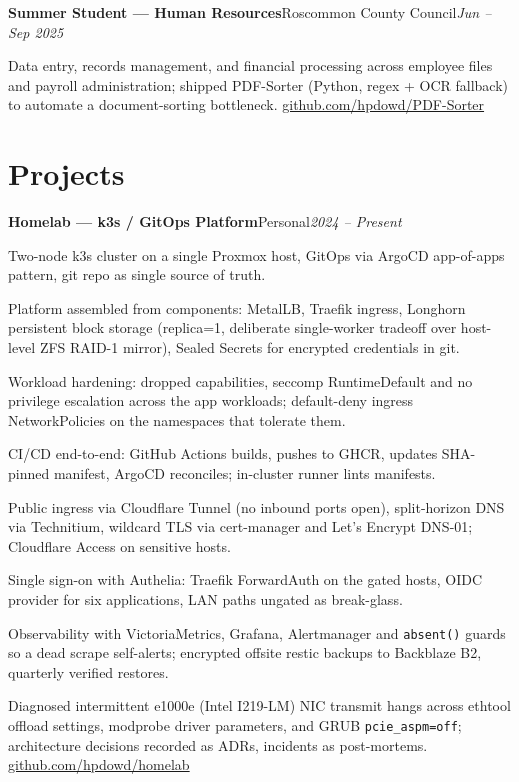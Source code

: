 \documentclass[a4paper,10pt]{article}
\newcommand{\cventry}[3]{\vspace{3pt}\noindent\textbf{#1}\enspace\textperiodcentered\enspace #2\hfill{\small\textit{\color{datesgrey}#3}}\par\vspace{1pt}}
\begin{document}
\cventry{Summer Student --- Human Resources}{Roscommon County Council}{Jun -- Sep 2025}
\begin{cvitems}
  \item Data entry, records management, and financial processing across employee files and payroll administration; shipped PDF-Sorter (Python, regex + OCR fallback) to automate a document-sorting bottleneck. \href{https://github.com/hpdowd/PDF-Sorter}{github.com/hpdowd/PDF-Sorter}
\end{cvitems}

\section{Projects}
\cventry{Homelab --- k3s / GitOps Platform}{Personal}{2024 -- Present}
\begin{cvitems}
  \item Two-node k3s cluster on a single Proxmox host, GitOps via ArgoCD app-of-apps pattern, git repo as single source of truth.
  \item Platform assembled from components: MetalLB, Traefik ingress, Longhorn persistent block storage (replica=1, deliberate single-worker tradeoff over host-level ZFS RAID-1 mirror), Sealed Secrets for encrypted credentials in git.
  \item Workload hardening: dropped capabilities, seccomp RuntimeDefault and no privilege escalation across the app workloads; default-deny ingress NetworkPolicies on the namespaces that tolerate them.
  \item CI/CD end-to-end: GitHub Actions builds, pushes to GHCR, updates SHA-pinned manifest, ArgoCD reconciles; in-cluster runner lints manifests.
  \item Public ingress via Cloudflare Tunnel (no inbound ports open), split-horizon DNS via Technitium, wildcard TLS via cert-manager and Let's Encrypt DNS-01; Cloudflare Access on sensitive hosts.
  \item Single sign-on with Authelia: Traefik ForwardAuth on the gated hosts, OIDC provider for six applications, LAN paths ungated as break-glass.
  \item Observability with VictoriaMetrics, Grafana, Alertmanager and \texttt{absent()} guards so a dead scrape self-alerts; encrypted offsite restic backups to Backblaze B2, quarterly verified restores.
  \item Diagnosed intermittent e1000e (Intel I219-LM) NIC transmit hangs across ethtool offload settings, modprobe driver parameters, and GRUB \texttt{pcie\_aspm=off}; architecture decisions recorded as ADRs, incidents as post-mortems. \href{https://github.com/hpdowd/homelab}{github.com/hpdowd/homelab}\end{cvitems}
\end{document}
